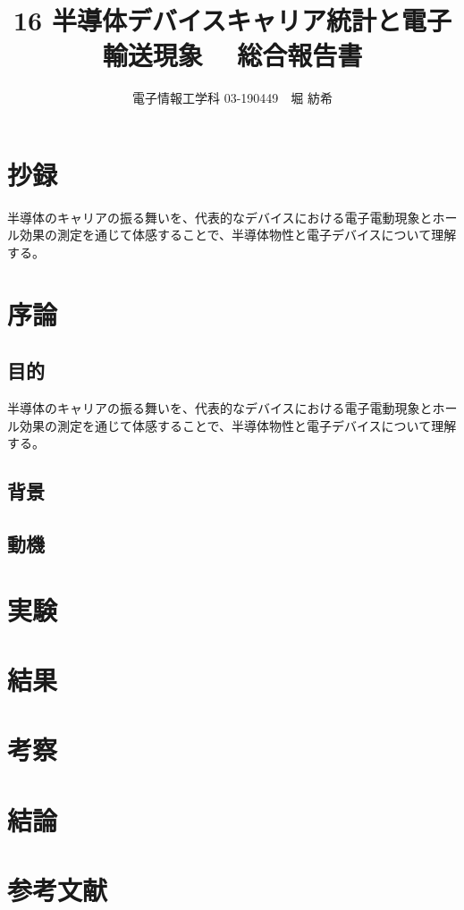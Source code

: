 \documentclass[]{jsarticle}
\title{16 半導体デバイスキャリア統計と電子輸送現象　 総合報告書}
\author{電子情報工学科 03-190449　堀 紡希}
\begin{document}
\maketitle


\section{抄録}
半導体のキャリアの振る舞いを、代表的なデバイスにおける電子電動現象とホール効果の測定を通じて体感することで、半導体物性と電子デバイスについて理解する。
\section{序論}
\subsection{目的}
半導体のキャリアの振る舞いを、代表的なデバイスにおける電子電動現象とホール効果の測定を通じて体感することで、半導体物性と電子デバイスについて理解する。
\subsection{背景}

\subsection{動機}

\section{実験}

\section{結果}

\section{考察}

\section{結論}

\section{参考文献}
\end{document}
